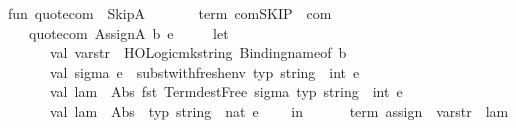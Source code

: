 \begin{isabellebody}
fun\ quote{\isacharunderscore}{\kern0pt}com\ {\isacharunderscore}{\kern0pt}\ SkipA\ {\isacharequal}{\kern0pt}\isanewline
\ \ \ \ \ \ {\isacharat}{\kern0pt}{\isacharbraceleft}{\kern0pt}term\ {\isachardoublequote}{\kern0pt}com{\isachardot}{\kern0pt}SKIP\ {\isacharcolon}{\kern0pt}{\isacharcolon}{\kern0pt}\ com{\isachardoublequote}{\kern0pt}{\isacharbraceright}{\kern0pt}\ \ \isanewline
\ \ {\isacharparenleft}{\kern0pt}{\isacharasterisk}{\kern0pt}{\isacharbar}{\kern0pt}\ quote{\isacharunderscore}{\kern0pt}com\ {\isacharparenleft}{\kern0pt}AssignA\ {\isacharparenleft}{\kern0pt}b{\isacharcomma}{\kern0pt}\ e{\isacharparenright}{\kern0pt}{\isacharparenright}{\kern0pt}\ {\isacharequal}{\kern0pt}\isanewline
\ \ \ \ let\isanewline
\ \ \ \ \ \ val\ var{\isacharunderscore}{\kern0pt}str\ {\isacharequal}{\kern0pt}\ HOLogic{\isachardot}{\kern0pt}mk{\isacharunderscore}{\kern0pt}string\ {\isacharparenleft}{\kern0pt}Binding{\isachardot}{\kern0pt}name{\isacharunderscore}{\kern0pt}of\ b{\isacharparenright}{\kern0pt}\isanewline
\isanewline
\ \ \ \ \ \ val\ {\isacharparenleft}{\kern0pt}sigma{\isacharcomma}{\kern0pt}\ e{\isacharprime}{\kern0pt}{\isacharparenright}{\kern0pt}\ {\isacharequal}{\kern0pt}\ subst{\isacharunderscore}{\kern0pt}with{\isacharunderscore}{\kern0pt}fresh{\isacharunderscore}{\kern0pt}env\ {\isacharat}{\kern0pt}{\isacharbraceleft}{\kern0pt}typ\ {\isachardoublequote}{\kern0pt}string\ {\isasymRightarrow}\ int{\isachardoublequote}{\kern0pt}{\isacharbraceright}{\kern0pt}\ e\isanewline
\ \ \ \ \ \ val\ lam\ {\isacharequal}{\kern0pt}\ Abs\ {\isacharparenleft}{\kern0pt}fst\ {\isacharparenleft}{\kern0pt}Term{\isachardot}{\kern0pt}dest{\isacharunderscore}{\kern0pt}Free\ sigma{\isacharparenright}{\kern0pt}{\isacharcomma}{\kern0pt}\ {\isacharat}{\kern0pt}{\isacharbraceleft}{\kern0pt}typ\ {\isachardoublequote}{\kern0pt}string\ {\isasymRightarrow}\ int{\isachardoublequote}{\kern0pt}{\isacharbraceright}{\kern0pt}{\isacharcomma}{\kern0pt}\ e{\isacharprime}{\kern0pt}{\isacharparenright}{\kern0pt}\isanewline
\ \ \ \ \ \ val\ lam\ {\isacharequal}{\kern0pt}\ Abs\ {\isacharparenleft}{\kern0pt}{\isachardoublequote}{\kern0pt}{\isasymsigma}{\isachardoublequote}{\kern0pt}{\isacharcomma}{\kern0pt}\ {\isacharat}{\kern0pt}{\isacharbraceleft}{\kern0pt}typ\ {\isachardoublequote}{\kern0pt}string\ {\isasymRightarrow}\ nat{\isachardoublequote}{\kern0pt}{\isacharbraceright}{\kern0pt}{\isacharcomma}{\kern0pt}\ e{\isacharprime}{\kern0pt}{\isacharparenright}{\kern0pt}\isanewline
\isanewline
\ \ \ \ in\isanewline
\ \ \ \ \ \ {\isacharat}{\kern0pt}{\isacharbraceleft}{\kern0pt}term\ assign{\isacharbraceright}{\kern0pt}\ {\isachardollar}{\kern0pt}\ var{\isacharunderscore}{\kern0pt}str\ {\isachardollar}{\kern0pt}\ lam\isanewline

\end{isabellebody}
